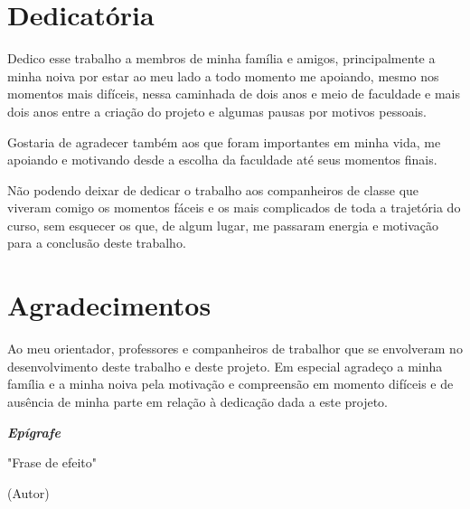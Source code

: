 \documentclass[brazil,ruledheader]{abntifes}
\begin{document}
\chapter*{Dedicatória}
    Dedico esse trabalho a membros de minha família e amigos, principalmente a minha noiva por estar ao meu lado a todo momento me apoiando, mesmo nos momentos mais difíceis, nessa caminhada de dois anos e meio de faculdade e mais dois anos entre a criação do projeto e algumas pausas por motivos pessoais.

    Gostaria de agradecer também aos que foram importantes em minha vida, me apoiando e motivando desde a escolha da faculdade até seus momentos finais.

    Não podendo deixar de dedicar o trabalho aos companheiros de classe que viveram comigo os momentos fáceis e os mais complicados de toda a trajetória do curso, sem esquecer os que, de algum lugar, me passaram energia e motivação para a conclusão deste trabalho.


\chapter*{Agradecimentos}
    Ao meu orientador, professores e companheiros de trabalhor que se envolveram no desenvolvimento deste trabalho e deste projeto. Em especial agradeço a minha família e a minha noiva pela motivação e compreensão em momento difíceis e de ausência de minha parte em relação à dedicação dada a este projeto.
\vfill
\null

\begin{center}
{\Huge {\bfseries\itshape Epígrafe}}\\[3cm]
\vspace{15cm}
\end{center}

\begin{espacoduplo}
\end{espacoduplo}

\epigraph{"Frase de efeito"}{(Autor)}
\end{document}

